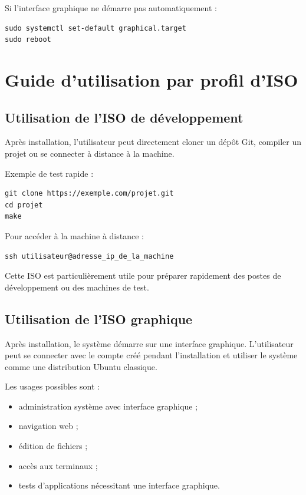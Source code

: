 \documentclass[12pt,a4paper]{article}
\begin{document}
Si l'interface graphique ne démarre pas automatiquement :

\begin{lstlisting}
sudo systemctl set-default graphical.target
sudo reboot
\end{lstlisting}

\section{Guide d'utilisation par profil d'ISO}

\subsection{Utilisation de l'ISO de développement}

Après installation, l'utilisateur peut directement cloner un dépôt Git, compiler un projet ou se connecter à distance à la machine.

Exemple de test rapide :

\begin{lstlisting}
git clone https://exemple.com/projet.git
cd projet
make
\end{lstlisting}

Pour accéder à la machine à distance :

\begin{lstlisting}
ssh utilisateur@adresse_ip_de_la_machine
\end{lstlisting}

Cette ISO est particulièrement utile pour préparer rapidement des postes de développement ou des machines de test.

\subsection{Utilisation de l'ISO graphique}

Après installation, le système démarre sur une interface graphique. L'utilisateur peut se connecter avec le compte créé pendant l'installation et utiliser le système comme une distribution Ubuntu classique.

Les usages possibles sont :

\begin{itemize}[label=--]
    \item administration système avec interface graphique ;
    \item navigation web ;
    \item édition de fichiers ;
    \item accès aux terminaux ;
    \item tests d'applications nécessitant une interface graphique.
\end{itemize}
\end{document}
